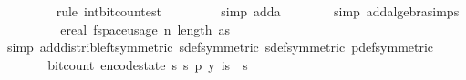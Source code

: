 \begin{isabellebody}
\ \ \ \ \ \ \ \isamarkupfalse%
\ {\isacharparenleft}{\kern0pt}rule\ int{\isacharunderscore}{\kern0pt}bit{\isacharunderscore}{\kern0pt}count{\isacharunderscore}{\kern0pt}est{\isacharparenright}{\kern0pt}\isanewline
\ \ \ \ \ \ \ \isamarkupfalse%
\ {\isacharparenleft}{\kern0pt}simp\ add{\isacharcolon}{\kern0pt}a{\isacharunderscore}{\kern0pt}{}{\isacharparenright}{\kern0pt}\isanewline
\ \ \ \ \ \ \isamarkupfalse%
\ {\isacharparenleft}{\kern0pt}simp\ add{\isacharcolon}{\kern0pt}algebra{\isacharunderscore}{\kern0pt}simps{\isacharparenright}{\kern0pt}\isanewline
\ \ \ \ \isamarkupfalse%
\ \isamarkupfalse%
\ {\isachardoublequoteopen}{\isachardot}{\kern0pt}{\isachardot}{\kern0pt}{\isachardot}{\kern0pt}\ {\isacharequal}{\kern0pt}\ ereal\ {\isacharparenleft}{\kern0pt}f{}{\isacharunderscore}{\kern0pt}space{\isacharunderscore}{\kern0pt}usage\ {\isacharparenleft}{\kern0pt}n{\isacharcomma}{\kern0pt}\ length\ as{\isacharcomma}{\kern0pt}\ {\isasymepsilon}{\isacharcomma}{\kern0pt}\ {\isasymdelta}{\isacharparenright}{\kern0pt}{\isacharparenright}{\kern0pt}{\isachardoublequoteclose}\isanewline
\ \ \ \ \ \ \isamarkupfalse%
\ {\isacharparenleft}{\kern0pt}simp\ add{\isacharcolon}{\kern0pt}distrib{\isacharunderscore}{\kern0pt}left{\isacharbrackleft}{\kern0pt}symmetric{\isacharbrackright}{\kern0pt}\ sdef{\isacharbrackleft}{\kern0pt}symmetric{\isacharbrackright}{\kern0pt}\ sdef{\isacharbrackleft}{\kern0pt}symmetric{\isacharbrackright}{\kern0pt}\ p{\isacharunderscore}{\kern0pt}def{\isacharbrackleft}{\kern0pt}symmetric{\isacharbrackright}{\kern0pt}{\isacharparenright}{\kern0pt}\isanewline
\ \ \ \ \isamarkupfalse%
\ \isamarkupfalse%
\ {\isachardoublequoteopen}bit{\isacharunderscore}{\kern0pt}count\ {\isacharparenleft}{\kern0pt}encode{\isacharunderscore}{\kern0pt}state\ {\isacharparenleft}{\kern0pt}s\ s\ p{\isacharcomma}{\kern0pt}\ y{\isacharcomma}{\kern0pt}\ {\isasymlambda}i{\isasymin}{\isacharbraceleft}{\kern0pt}{}{\isachardot}{\kern0pt}{\isachardot}{\kern0pt}{\isacharless}{\kern0pt}s\ {\isasymtimes}\ {\isacharbraceleft}{\kern0pt}{}{\isachardot}{\kern0pt}{\isachardot}{\kern0pt}{\isacharless}{\kern0pt}s\isanewline

\end{isabellebody}
